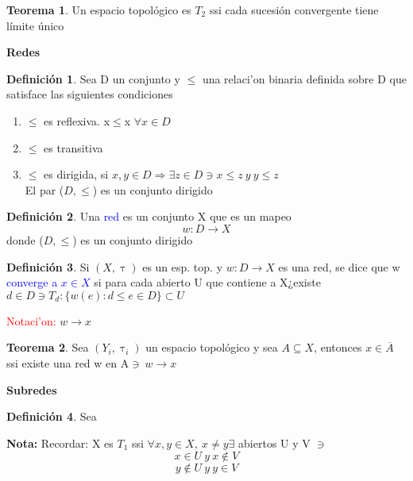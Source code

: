 \documentclass{article}
\theoremstyle{definition}
\newtheorem{definition}{Definición}[section]
\newtheorem{theorem}{Teorema}[section]
\begin{document}

\begin{theorem}
	Un espacio topológico es $T_2$ ssi cada sucesión convergente tiene límite único
\end{theorem}
\begin{LARGE}
	\textbf{Redes}
\end{LARGE}
\begin{definition}
	Sea D un conjunto y $\leq$ una relaci'on binaria definida sobre D que satisface las siguientes condiciones 
	\begin{enumerate}
		\item $\leq$ es reflexiva. x$\leq$x $\forall x\in D$
		\item $\leq$ es transitiva
		\item $\leq$ es dirigida, si $x,y\in D\Rightarrow\exists z\in D\ni x\leq z\ y \ y\leq z$\\
		El par ($D,\leq$) es un conjunto dirigido
	\end{enumerate}
\end{definition}
\begin{definition}
	Una \textcolor{blue}{red} es un conjunto X que es un mapeo
	\[w:D\to X\]
	donde ($D,\leq$) es un conjunto dirigido
\end{definition}
\begin{definition}
	Si $(X,\uptau)$ es un esp. top. y $w:D\to X$ es una red, se dice que w \textcolor{blue}{converge a $x\in X$} si para cada abierto U que contiene a X¿existe $d\in D\ni T_d:\{w(e):d\leq e\in D\}\subset U$
\end{definition}
\textcolor{red}{Notaci'on: }$w\to x$
\begin{theorem}
	Sea $(Y_i,\uptau_i)$ un espacio topológico y sea $A\subseteq X$, entonces $x\in \overline{A}$ ssi existe una red w en A$\ni\ w\to x$
\end{theorem}
\begin{LARGE}
	\textbf{Subredes}
\end{LARGE}
\begin{definition}
	Sea 
\end{definition}


















\textbf{Nota: } Recordar: X es $T_1$ ssi $\forall x,y\in X,\ x\neq y\exists$ abiertos U y V $\ni$
	\[x\in U \ y \ x\not\in V\]
	\[y\not\in U \ y \ y\in V\]
\end{document}
